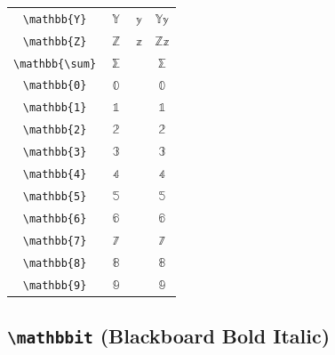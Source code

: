 \documentclass[12pt,a4paper]{article}
\begin{document}
\begin{longtable}{|c|c|c|c|}
\verb|\mathbb{Y}| & $\mathbb{Y}$ & $\mathbb{y}$ & $ 𝕐 𝕪 $ \\
\verb|\mathbb{Z}| & $\mathbb{Z}$ & $\mathbb{z}$ & $ ℤ 𝕫 $ \\
\verb|\mathbb{\sum}| & $\mathbb{\sum}$ & & $ ⅀ $ \\
\verb|\mathbb{0}| & $\mathbb{0}$ & & $ 𝟘 $ \\
\verb|\mathbb{1}| & $\mathbb{1}$ & & $ 𝟙 $ \\
\verb|\mathbb{2}| & $\mathbb{2}$ & & $ 𝟚 $ \\
\verb|\mathbb{3}| & $\mathbb{3}$ & & $ 𝟛 $ \\
\verb|\mathbb{4}| & $\mathbb{4}$ & & $ 𝟜 $ \\
\verb|\mathbb{5}| & $\mathbb{5}$ & & $ 𝟝 $ \\
\verb|\mathbb{6}| & $\mathbb{6}$ & & $ 𝟞 $ \\
\verb|\mathbb{7}| & $\mathbb{7}$ & & $ 𝟟 $ \\
\verb|\mathbb{8}| & $\mathbb{8}$ & & $ 𝟠 $ \\
\verb|\mathbb{9}| & $\mathbb{9}$ & & $ 𝟡 $ \\
\hline
\end{longtable}

\newpage

\subsection*{\texttt{\textbackslash{}mathbbit} (Blackboard Bold Italic)}
\end{document}
